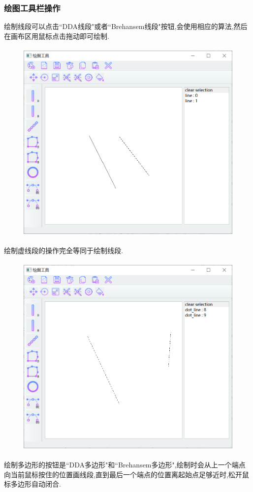 \documentclass[a4paper,UTF8]{article}
\theoremstyle{definition}
\begin{document}
\subsubsection{绘图工具栏操作}
绘制线段可以点击``DDA线段"或者``Brehansem线段"按钮,会使用相应的算法,然后在画布区用鼠标点击拖动即可绘制.
\begin{figure}[H]
	\includegraphics[width=5in,height=4in]{line.png}
\end{figure}
绘制虚线段的操作完全等同于绘制线段.\\
\begin{figure}[H]
	\includegraphics[width=5in,height=4in]{dotted_line.png}
\end{figure}
\indent 绘制多边形的按钮是``DDA多边形"和``Brehansem多边形",绘制时会从上一个端点向当前鼠标按住的位置画线段,直到最后一个端点的位置离起始点足够近时,松开鼠标多边形自动闭合.\\
\end{document}
